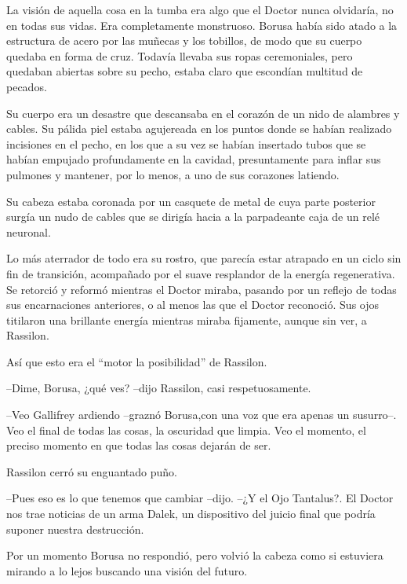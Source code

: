 La visión de aquella cosa en la tumba era algo que el Doctor nunca olvidaría, no en todas sus vidas. Era completamente monstruoso. Borusa había sido atado a la estructura de acero por las muñecas y los tobillos, de modo que su cuerpo quedaba en forma de cruz. Todavía llevaba sus ropas ceremoniales, pero quedaban abiertas sobre su pecho, estaba claro que escondían multitud de pecados. 

Su cuerpo era un desastre que descansaba en el corazón de un nido de alambres y cables. Su pálida piel estaba agujereada en los puntos donde se habían realizado incisiones en el pecho, en los que a su vez se habían insertado tubos que se habían empujado profundamente en la cavidad, presuntamente para inflar sus pulmones y mantener, por lo menos, a uno de sus corazones latiendo. 

Su cabeza estaba coronada por un casquete de metal de cuya parte posterior surgía un nudo de cables que se dirigía hacia a la parpadeante caja de un relé neuronal. 

Lo más aterrador de todo era su rostro, que parecía estar atrapado en un ciclo sin fin de transición, acompañado por el suave resplandor de la energía regenerativa. Se retorció y reformó mientras el Doctor miraba, pasando por un reflejo de todas sus encarnaciones anteriores, o al menos las que el Doctor reconoció. Sus ojos titilaron una brillante energía mientras miraba fijamente, aunque sin ver, a Rassilon. 

Así que esto era el ``motor la posibilidad'' de Rassilon. 



--Dime, Borusa, ¿qué ves? --dijo Rassilon, casi respetuosamente. 

--Veo Gallifrey ardiendo --graznó Borusa,con una voz que era apenas un susurro--. Veo el final de todas las cosas, la oscuridad que limpia. Veo el momento, el preciso momento en que todas las cosas dejarán de ser. 



Rassilon cerró su enguantado puño. 



--Pues eso es lo que tenemos que cambiar --dijo. --¿Y el Ojo Tantalus?. El Doctor nos trae noticias de un arma Dalek, un dispositivo del juicio final que podría suponer nuestra destrucción. 



Por un momento Borusa no respondió, pero volvió la cabeza como si estuviera mirando a lo lejos buscando una visión del futuro. 



